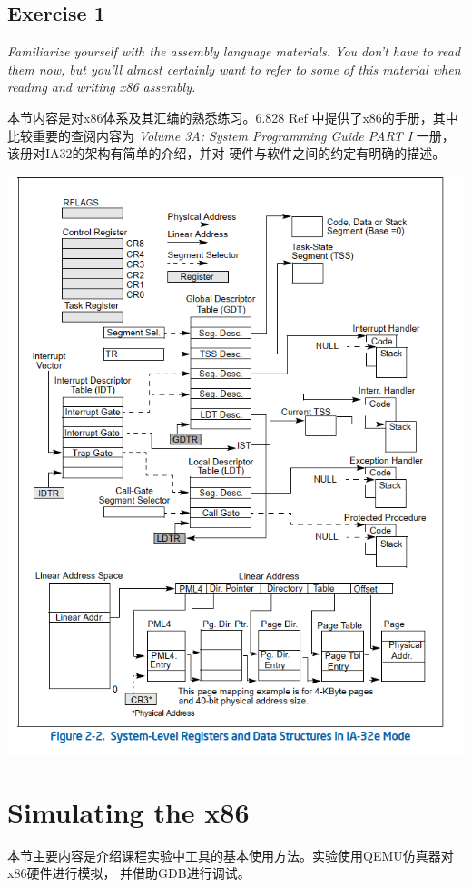 \documentclass[12pt, letterpaper]{report}
\begin{document}
\subsection{\large Exercise 1}
\textsl{ Familiarize yourself with the assembly language materials.
         You don't have to read them now, but you'll almost certainly 
         want to refer to some of this material
         when reading and writing x86 assembly.} \par
\quad \par
本节内容是对x86体系及其汇编的熟悉练习。6.828 Ref 中提供了x86的手册，其中比较重要的查阅内容为
 \textsl{Volume 3A: System Programming Guide PART I} 一册，该册对IA32的架构有简单的介绍，并对
硬件与软件之间的约定有明确的描述。\par 
\quad \par
{
\includegraphics[width=\textwidth,height=0.78\textheight]{IA32-syslevel}
}
\quad \par
\section[\large Simulating the x86]{Simulating the x86}
本节主要内容是介绍课程实验中工具的基本使用方法。实验使用QEMU仿真器对x86硬件进行模拟，
并借助GDB进行调试。
\end{document}

